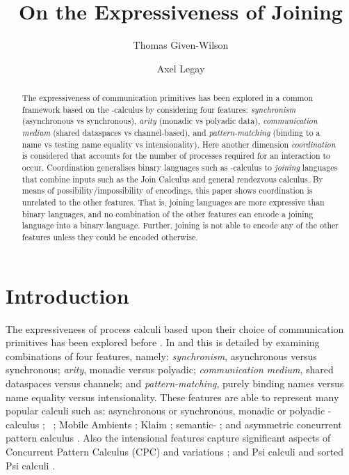 \documentclass[submission,copyright,creativecommons]{eptcs}
\title{On the Expressiveness of Joining}
\author{Thomas Given-Wilson
\institute{Inria, France}
\and
Axel Legay
\institute{Inria, France}
}
\begin{document}
\makeatactive

\maketitle  

\begin{abstract}
The expressiveness of communication primitives has been explored in a common framework
based on the -calculus by considering
four features:
{\em synchronism} (asynchronous vs synchronous),
{\em arity} (monadic vs polyadic data),
{\em communication medium} (shared dataspaces vs channel-based),
and {\em pattern-matching} (binding to a name vs testing name equality  vs intensionality).
Here another dimension {\em coordination} is considered that accounts for the number of
processes required for an interaction to occur.
Coordination generalises binary languages such as -calculus to {\em joining} languages
that combine inputs such as the Join Calculus and general rendezvous calculus.
By means of possibility/impossibility of encodings, this paper shows coordination is unrelated to the other features.
That is, joining languages are more expressive than binary languages, and no combination
of the other features can encode a joining language into a binary language.
Further, joining is not able to encode any of the other features unless they could be encoded
otherwise.
\end{abstract}

\section{Introduction}

The expressiveness of process calculi based upon their choice of communication primitives
has been explored before
\cite{Palamidessi:2003:CEP:966707.966709,journals/iandc/BusiGZ00,DeNicola:2006:EPK:1148743.1148750,G:IC08,GivenWilsonPHD,givenwilson:hal-01026301}.
In \cite{G:IC08} and \cite{givenwilson:hal-01026301} this is detailed by examining combinations
of four features, namely:
{\em synchronism}, asynchronous versus synchronous;
{\em arity}, monadic versus polyadic;
{\em communication medium}, shared dataspaces versus channels;
and {\em pattern-matching}, purely binding names versus name equality versus intensionality.
These features are able to represent many popular calculi \cite{G:IC08,givenwilson:hal-01026301} such as:
asynchronous or synchronous,  monadic or polyadic -calculus
  \cite{Milner:1992:CMP:162037.162038,Milner:1992:CMP:162037.162039,milner:polyadic-tutorial};
\Linda~\cite{Gel85};
Mobile Ambients  \cite{DBLP:conf/fossacs/CardelliG98};
{\sc Klaim} \cite{10.1109/32.685256};
semantic- \cite{Castagna:2008:SSP:1367144.1367262};
and asymmetric concurrent pattern calculus \cite{DBLP:journals/corr/Given-Wilson14}.
Also the intensional features capture significant aspects of
Concurrent Pattern Calculus (CPC) \cite{GivenWilsonGorlaJay10,givenwilson:hal-00987578}
and variations \cite{GivenWilsonPHD,DBLP:journals/corr/Given-Wilson14};
and Psi calculi \cite{BJPV11} and sorted Psi calculi \cite{DBLP:conf/tgc/BorgstromGPVP13}.
\end{document}

